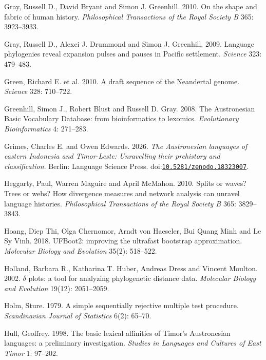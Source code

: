 \documentclass[11pt]{article}
\newcommand{\doi}[1]{doi:\href{https://doi.org/#1}{\nolinkurl{#1}}}
\begin{document}
\begin{thebibliography}{}
Gray, Russell D., David Bryant and Simon J. Greenhill. 2010. On the shape and fabric of human history. \emph{Philosophical Transactions of the Royal Society B} 365: 3923--3933.

Gray, Russell D., Alexei J. Drummond and Simon J. Greenhill. 2009. Language phylogenies reveal expansion pulses and pauses in Pacific settlement. \emph{Science} 323: 479--483.

Green, Richard E. et al. 2010. A draft sequence of the Neandertal genome. \emph{Science} 328: 710--722.

Greenhill, Simon J., Robert Blust and Russell D. Gray. 2008. The Austronesian Basic Vocabulary Database: from bioinformatics to lexomics. \emph{Evolutionary Bioinformatics} 4: 271--283.

Grimes, Charles E. and Owen Edwards. 2026. \emph{The Austronesian languages of eastern Indonesia and Timor-Leste: Unravelling their prehistory and classification}. Berlin: Language Science Press. \doi{10.5281/zenodo.18323007}.

Heggarty, Paul, Warren Maguire and April McMahon. 2010. Splits or waves? Trees or webs? How divergence measures and network analysis can unravel language histories. \emph{Philosophical Transactions of the Royal Society B} 365: 3829--3843.

Hoang, Diep Thi, Olga Chernomor, Arndt von Haeseler, Bui Quang Minh and Le Sy Vinh. 2018. UFBoot2: improving the ultrafast bootstrap approximation. \emph{Molecular Biology and Evolution} 35(2): 518--522.

Holland, Barbara R., Katharina T. Huber, Andreas Dress and Vincent Moulton. 2002. $\delta$ plots: a tool for analyzing phylogenetic distance data. \emph{Molecular Biology and Evolution} 19(12): 2051--2059.

Holm, Sture. 1979. A simple sequentially rejective multiple test procedure. \emph{Scandinavian Journal of Statistics} 6(2): 65--70.

Hull, Geoffrey. 1998. The basic lexical affinities of Timor's Austronesian languages: a preliminary investigation. \emph{Studies in Languages and Cultures of East Timor} 1: 97--202.


\end{thebibliography}
\end{document}
